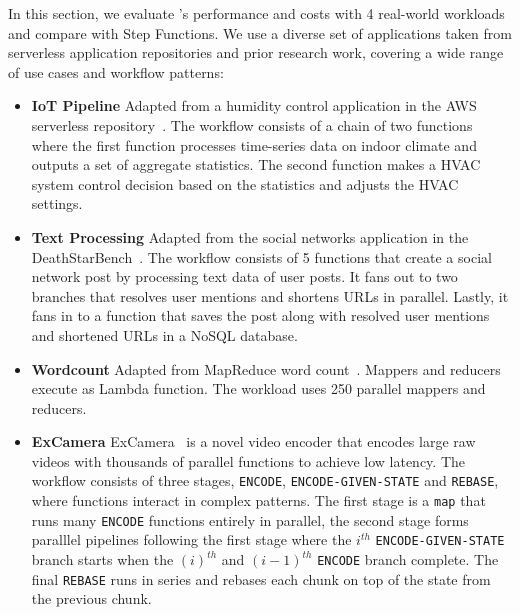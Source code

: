 In this section, we evaluate \name{}'s performance and costs with 4 real-world
workloads and compare with Step Functions. We use a diverse set of applications
taken from serverless application repositories and prior research work, covering a wide range of use cases and workflow patterns: 

\begin{itemize}
	\item \textbf{IoT Pipeline} Adapted from a humidity control application in the
	AWS serverless repository~\cite{iot-pipeline}. The workflow consists of a
	chain of two functions where the first function processes time-series data on
	indoor climate and outputs a set of aggregate statistics. The second function
	makes a HVAC system control decision based on the statistics and adjusts the
	HVAC settings.
	
	\item \textbf{Text Processing} Adapted from the social networks application in
	the DeathStarBench~\cite{deathstar}. The workflow consists of 5 functions that
	create a social network post by processing text data of user posts. It fans
	out to two branches that resolves user mentions and shortens URLs in parallel.
	Lastly, it fans in to a function that saves the post along with resolved
	user mentions and shortened URLs in a NoSQL database.
	
	\item \textbf{Wordcount} Adapted from MapReduce word count~\cite{mapreduce}.
	Mappers and reducers execute as Lambda function. The workload uses 250
	parallel mappers and reducers.
	
	\item \textbf{ExCamera} ExCamera~\cite{excamera} is a novel video encoder that
	encodes large raw videos with thousands of parallel functions to achieve
	low latency. The workflow consists of three stages, \texttt{ENCODE},
	\texttt{ENCODE-GIVEN-STATE} and \texttt{REBASE}, where functions interact
	in complex patterns. The first stage is a \texttt{map} that runs many
	\texttt{ENCODE} functions entirely in parallel, the second stage forms
	paralllel pipelines following the first stage where the $i^{th}$
	\texttt{ENCODE-GIVEN-STATE} branch starts when the $(i)^{th}$ and
	$(i-1)^{th}$ \texttt{ENCODE} branch complete. The final \texttt{REBASE}
	runs in series and rebases each chunk on top of the state from the
	previous chunk.
	

\end{itemize}
